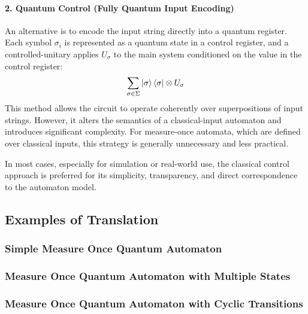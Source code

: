 \paragraph{2. Quantum Control (Fully Quantum Input Encoding)}
An alternative is to encode the input string directly into a quantum register. Each symbol $\sigma_i$ is represented as a quantum state in a control register, and a controlled-unitary applies $U_{\sigma}$ to the main system conditioned on the value in the control register:
\[
\sum_{\sigma \in \Sigma} \ket{\sigma}\bra{\sigma} \otimes U_\sigma
\]
This method allows the circuit to operate coherently over superpositions of input strings. However, it alters the semantics of a classical-input automaton and introduces significant complexity. For measure-once automata, which are defined over classical inputs, this strategy is generally unnecessary and less practical.

\noindent
In most cases, especially for simulation or real-world use, the classical control approach is preferred for its simplicity, transparency, and direct correspondence to the automaton model.

\subsection{Examples of Translation}
\subsubsection{Simple Measure Once Quantum Automaton}
\subsubsection{Measure Once Quantum Automaton with Multiple States}
\subsubsection{Measure Once Quantum Automaton with Cyclic Transitions}